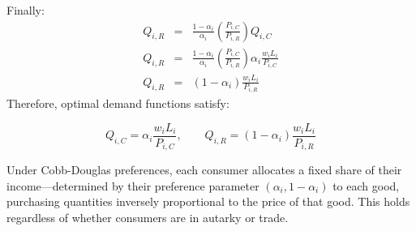 \documentclass[11pt,letterpaper]{article}
\begin{document}
\normalsize
Finally:
{\scriptsize
\begin{eqnarray*}
     Q_{i,R}  &=& \frac{1-\alpha_i}{\alpha_i } \left( \frac{P_{i,C}}{P_{i,R}}\right) Q_{i,C}  \\
     Q_{i,R}  &=& \frac{1-\alpha_i}{\alpha_i } \left( \frac{P_{i,C}}{P_{i,R}}\right) \alpha_i  \frac{w_i L_i}{P_{i,C}} \\
      Q_{i,R}  &=& (1-\alpha_i) \frac{w_i L_i}{P_{i,R}}
\end{eqnarray*}
}
\normalsize
Therefore, optimal demand functions satisfy:

\begin{equation}\label{eq: demand}
    Q_{i,C} = \alpha_i  \frac{w_i L_i}{P_{i,C}}, \qquad Q_{i,R} = (1-\alpha_i) \frac{w_i L_i}{P_{i,R}}
\end{equation}
\normalsize

Under Cobb-Douglas preferences, each consumer allocates a fixed share of their income—determined by their preference parameter $(\alpha_i, 1-\alpha_i)$ to each good, purchasing quantities inversely proportional to the price of that good. This holds regardless of whether consumers are in autarky or trade. 
\end{document}
